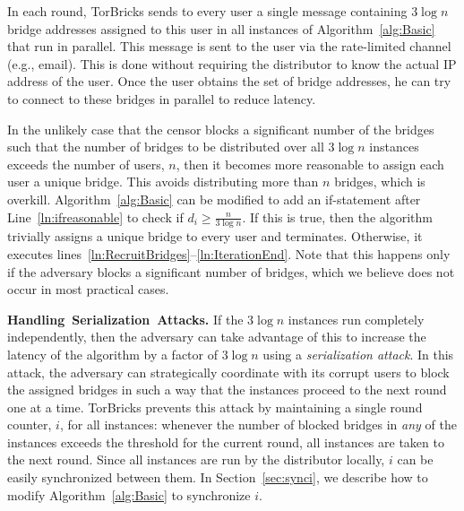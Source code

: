 \documentclass[a4paper,UKenglish]{lipics-v2016}
\newcommand{\fullpaper}[1]{#1}
\newcommand{\fullpaper}[1]{}
\newcommand{\bricks}{}
\def\bricks/{\mbox{TorBricks}}
\newcommand{\sfsize}{\fontsize{0.68\baselineskip}{0.68\baselineskip}\selectfont}
\newcommand{\sans}[1]{\textbf{\textsf{\sfsize \mbox{#1}}}}
\newcommand{\para}[1]{\vspace{0.55em} \noindent \sans{{\mbox{#1}}}}
\begin{document}
In each round, \bricks/ sends to every user a single message containing $3\log{n}$ bridge addresses assigned to this user in all  instances of Algorithm~\ref{alg:Basic} that run in parallel. This message is sent to the user via the rate-limited channel (e.g., email). \fullpaper{This is done without requiring the distributor to know the actual IP address of the user. Once the user obtains the set of bridge addresses, he can try to connect to these bridges in parallel to reduce latency.}

In the unlikely case that the censor blocks a significant number of the bridges such that the number of bridges to be distributed over all $3\log{n}$ instances exceeds the number of users, $n$, then it becomes more reasonable to assign each user a unique bridge. This avoids distributing more than $n$ bridges, which is overkill. 
Algorithm~\ref{alg:Basic} can be modified to add an if-statement after Line~\ref{ln:ifreasonable} to check if ${d_i \geq \frac{n}{3\log{n}}}$. If this is true, then the algorithm trivially assigns a unique bridge to every user and terminates. Otherwise, it executes lines~\ref{ln:RecruitBridges}--\ref{ln:IterationEnd}.
Note that this happens only if the adversary blocks a significant number of bridges, which we believe does not occur in most practical cases. %

\para{Handling Serialization Attacks.}
If the $3\log{n}$ instances run completely independently, then the adversary can take advantage of this to increase the latency of the algorithm by a factor of $3\log{n}$ using a \emph{serialization attack}. In this attack, the adversary can strategically coordinate with its corrupt users to block the assigned bridges in such a way that the instances proceed to the next round one at a time. 
\bricks/ prevents this attack by maintaining a single round counter, $i$, for all instances: whenever the number of blocked bridges in \emph{any} of the instances exceeds the threshold for the current round, all instances are taken to the next round. Since all instances are run by the distributor locally, $i$ can be easily synchronized between them. In Section~\ref{sec:synci}, we describe how to modify Algorithm~\ref{alg:Basic} to synchronize $i$.
\end{document}

